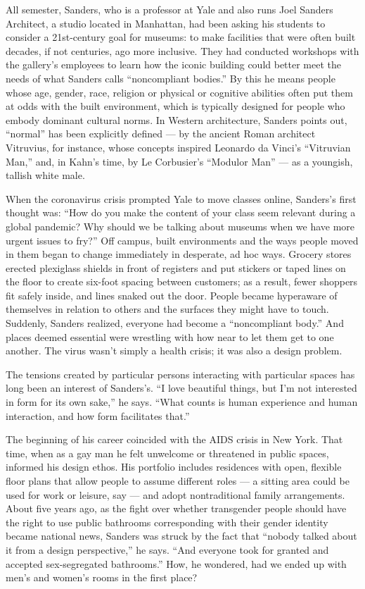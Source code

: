 All semester, Sanders, who is a professor at Yale and also runs Joel
Sanders Architect, a studio located in Manhattan, had been asking his
students to consider a 21st-century goal for museums: to make facilities
that were often built decades, if not centuries, ago more inclusive.
They had conducted workshops with the gallery's employees to learn how
the iconic building could better meet the needs of what Sanders calls
``noncompliant bodies.'' By this he means people whose age, gender,
race, religion or physical or cognitive abilities often put them at odds
with the built environment, which is typically designed for people who
embody dominant cultural norms. In Western architecture, Sanders points
out, ``normal'' has been explicitly defined --- by the ancient Roman
architect Vitruvius, for instance, whose concepts inspired Leonardo da
Vinci's ``Vitruvian Man,'' and, in Kahn's time, by Le Corbusier's
``Modulor Man'' --- as a youngish, tallish white male.

When the coronavirus crisis prompted Yale to move classes online,
Sanders's first thought was: ``How do you make the content of your class
seem relevant during a global pandemic? Why should we be talking about
museums when we have more urgent issues to fry?'' Off campus, built
environments and the ways people moved in them began to change
immediately in desperate, ad hoc ways. Grocery stores erected plexiglass
shields in front of registers and put stickers or taped lines on the
floor to create six-foot spacing between customers; as a result, fewer
shoppers fit safely inside, and lines snaked out the door. People became
hyperaware of themselves in relation to others and the surfaces they
might have to touch. Suddenly, Sanders realized, everyone had become a
``noncompliant body.'' And places deemed essential were wrestling with
how near to let them get to one another. The virus wasn't simply a
health crisis; it was also a design problem.

The tensions created by particular persons interacting with particular
spaces has long been an interest of Sanders's. ``I love beautiful
things, but I'm not interested in form for its own sake,'' he says.
``What counts is human experience and human interaction, and how form
facilitates that.''

The beginning of his career coincided with the AIDS crisis in New York.
That time, when as a gay man he felt unwelcome or threatened in public
spaces, informed his design ethos. His portfolio includes residences
with open, flexible floor plans that allow people to assume different
roles --- a sitting area could be used for work or leisure, say --- and
adopt nontraditional family arrangements. About five years ago, as the
fight over whether transgender people should have the right to use
public bathrooms corresponding with their gender identity became
national news, Sanders was struck by the fact that ``nobody talked about
it from a design perspective,'' he says. ``And everyone took for granted
and accepted sex-segregated bathrooms.'' How, he wondered, had we ended
up with men's and women's rooms in the first place?

